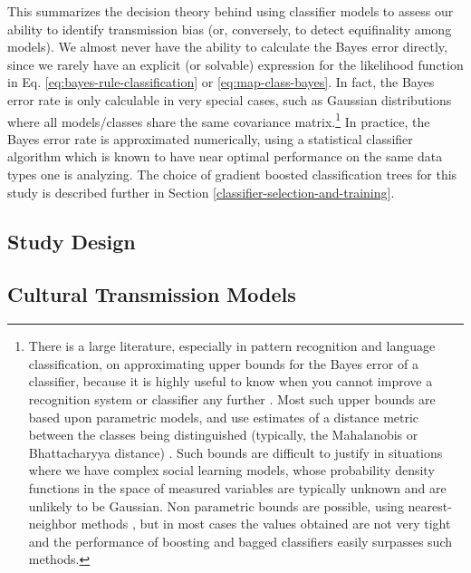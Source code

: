 \documentclass[10pt,letterpaper]{article}
\begin{document}
This summarizes the decision theory behind using classifier models to assess our ability to identify transmission bias (or, conversely, to detect equifinality among models).  We almost never have the ability to calculate the Bayes error directly, since we rarely have an explicit (or solvable) expression for the likelihood function in Eq. \ref{eq:bayes-rule-classification} or \ref{eq:map-class-bayes}.  In fact, the Bayes error rate is only calculable in very special cases, such as Gaussian distributions where all models/classes share the same covariance matrix.\footnote{There is a large literature, especially in pattern recognition and language classification, on approximating upper bounds for the Bayes error of a classifier, because it is highly useful to know when you cannot improve a recognition system or classifier any further \cite{Antos:1999dn, Dobbin:2009du, McLachlan:1975eo}.  Most such upper bounds are based upon parametric models, and use estimates of a distance metric between the classes being distinguished (typically, the Mahalanobis or Bhattacharyya distance) \cite{devijver1982pattern}.  Such bounds are difficult to justify in situations where we have complex social learning models, whose probability density functions in the space of measured variables are typically unknown and are unlikely to be Gaussian.  Non parametric bounds are possible, using nearest-neighbor methods \cite{Loizou:1987bi}, but in most cases the values obtained are not very tight and the performance of boosting and bagged classifiers easily surpasses such methods.}  In practice, the Bayes error rate is approximated numerically, using a statistical classifier algorithm which is known to have near optimal performance on the same data types one is analyzing.  The choice of gradient boosted classification trees for this study is described further in Section \ref{classifier-selection-and-training}.  


\subsection{Study Design}
\label{study-design}





\subsection{Cultural Transmission Models}\label{simulated-samples-of-cultural-transmission-models}
\end{document}
